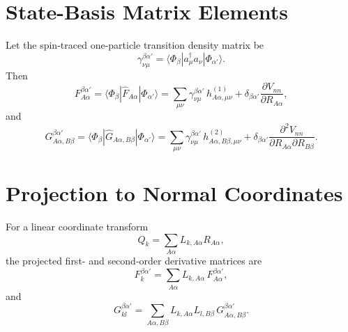\documentclass[11pt]{article}
\begin{document}
\section*{State-Basis Matrix Elements}

Let the spin-traced one-particle transition density matrix be
\begin{equation}
\gamma^{\beta\alpha'}_{\nu\mu}
=
\langle \Phi_\beta | a_\mu^\dagger a_\nu | \Phi_{\alpha'} \rangle.
\end{equation}
Then
\begin{equation}
F_{A\alpha}^{\beta\alpha'}
=
\langle \Phi_\beta | \hat F_{A\alpha} | \Phi_{\alpha'} \rangle
=
\sum_{\mu\nu}
\gamma^{\beta\alpha'}_{\nu\mu}\,
h^{(1)}_{A\alpha,\mu\nu}
+
\delta_{\beta\alpha'}
\frac{\partial V_{nn}}{\partial R_{A\alpha}},
\end{equation}
and
\begin{equation}
G_{A\alpha,B\beta}^{\beta\alpha'}
=
\langle \Phi_\beta | \hat G_{A\alpha,B\beta} | \Phi_{\alpha'} \rangle
=
\sum_{\mu\nu}
\gamma^{\beta\alpha'}_{\nu\mu}\,
h^{(2)}_{A\alpha,B\beta,\mu\nu}
+
\delta_{\beta\alpha'}
\frac{\partial^2 V_{nn}}
{\partial R_{A\alpha}\partial R_{B\beta}}.
\end{equation}

\section*{Projection to Normal Coordinates}

For a linear coordinate transform
\begin{equation}
Q_k = \sum_{A\alpha} L_{k,A\alpha} R_{A\alpha},
\end{equation}
the projected first- and second-order derivative matrices are
\begin{equation}
F_k^{\beta\alpha'}
=
\sum_{A\alpha} L_{k,A\alpha}\,
F_{A\alpha}^{\beta\alpha'},
\end{equation}
and
\begin{equation}
G_{kl}^{\beta\alpha'}
=
\sum_{A\alpha,B\beta}
L_{k,A\alpha}L_{l,B\beta}\,
G_{A\alpha,B\beta}^{\beta\alpha'}.
\end{equation}
\end{document}
